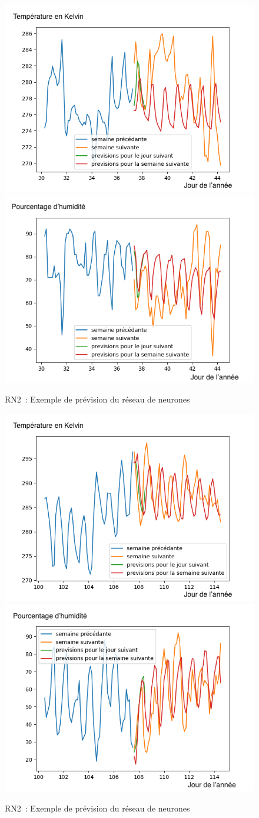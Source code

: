 \documentclass[11pt,a4paper]{article}
\begin{document}
\begin{figure} [H]
\centering
\includegraphics[width=0.48 \textwidth]{./imagesTIPE/imagesIA/dessinTempIA30,25.png}\quad
\includegraphics[width=0.48 \textwidth]{./imagesTIPE/imagesIA/dessinHumiIA30,25.png}
\caption{\label{fig:cosDS1} RN2~: Exemple de prévision du réseau de neurones}
\end{figure}
\begin{figure} [H]
\centering
\includegraphics[width=0.48 \textwidth]{./imagesTIPE/imagesIA/dessinTempIA100,5.png}\quad
\includegraphics[width=0.48 \textwidth]{./imagesTIPE/imagesIA/dessinHumiIA100,5.png}
\caption{\label{fig:cosDS2} RN2~: Exemple de prévision du réseau de neurones}
\end{figure}
\end{document}
